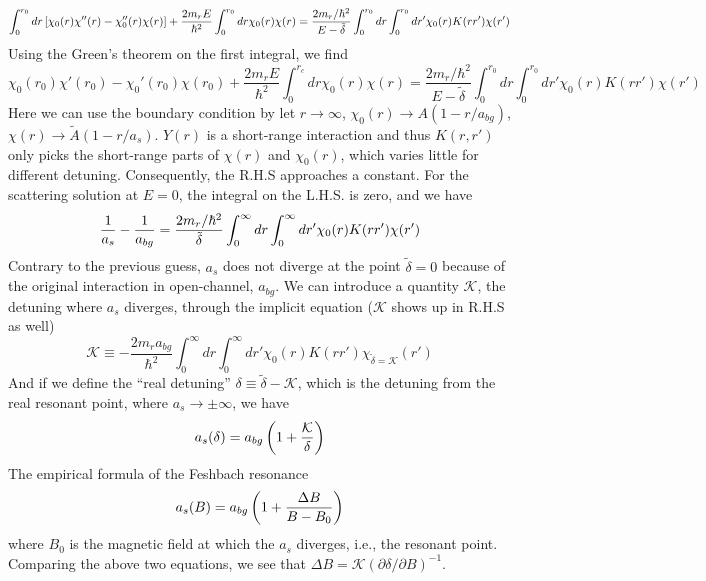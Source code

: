 \begin{equation*}
\int_{0}^{r_{0}}dr\left[\chi_{0}(r)\chi''(r)-\chi_{0}''(r)\chi(r)\right]+\frac{2m_{r}E}{\hbar^{2}}\int_{0}^{r_{0}}dr\chi_{0}(r)\chi(r)
=\frac{2m_{r}/\hbar^{2}}{E-\tilde\delta}\int_{0}^{r_{0}}dr\int_{0}^{r_{0}}dr'\chi_{0}(r)K(rr')\chi(r')
\end{equation*}
Using the Green's theorem on the first integral, we find 
\begin{equation}
\chi_{0}(r_{0})\chi'(r_{0})-\chi_{0}'(r_{0})\chi(r_{0})+\frac{2m_{r}E}{\hbar^{2}}\int_{0}^{r_{c}}dr\chi_{0}(r)\chi(r)
=\frac{2m_{r}/\hbar^{2}}{E-\tilde\delta}\int_{0}^{r_{0}}dr\int_{0}^{r_{0}}dr'\chi_{0}(r)K(rr')\chi(r')
\end{equation}
Here we can use the boundary condition by let $r\rightarrow\infty$, $\chi_{0}(r)\rightarrow{A}(1-r/a_{bg})$, $\chi(r)\rightarrow\tilde{A}(1-r/a_{s})$.  $Y(r)$ is a short-range interaction and thus $K(r,r')$ only picks the short-range parts of $\chi(r)$ and $\chi_{0}(r)$, which varies little for different detuning. Consequently,  the R.H.S approaches a constant.  For the scattering solution at  $E=0$, the integral on the L.H.S. is zero, and we have 
\begin{equation}
\frac{1}{a_{s}}-\frac{1}{a_{bg}}=\frac{2m_{r}/\hbar^{2}}{\tilde\delta}\int_{0}^{\infty}dr\int_{0}^{\infty}dr'\chi_{0}(r)K(rr')\chi(r')
\end{equation}
Contrary to the previous guess, $a_{s}$ does not diverge at the point $\tilde\delta=0$ because of the original interaction in open-channel, $a_{bg}$.  We can introduce a quantity $\mathcal{K}$, the detuning where $a_{s}$ diverges, through the implicit equation ($\mathcal{K}$ shows up in R.H.S as well)
\begin{equation}\label{eq:intro:kappa}
\mathcal{K}\equiv-\frac{2m_{r}a_{bg}}{\hbar^{2}}\int_{0}^{\infty}{dr}\int_{0}^{\infty}dr'\chi_{0}(r)K(rr')\chi_{\tilde\delta=\mathcal{K}}(r')
\end{equation}
And if we define the ``real detuning'' $\delta\equiv\tilde\delta-\mathcal{K}$, which is the detuning from the real resonant point, where $a_{s}\to\pm\infty$, we have 
\begin{equation}\label{eq:intro:asK}
a_{s}(\delta)=a_{bg}\left(1+\frac{\mathcal{K}}{\delta}\right)
\end{equation}
The empirical formula of the Feshbach resonance
\begin{equation}
a_{s}(B)=a_{bg}\left(1+\frac{\Delta{B}}{B-B_{0}}\right)
\end{equation}
where $B_{0}$ is the magnetic field at which the $a_{s}$ diverges, i.e., the  resonant point.  Comparing the above two equations, we see that $\Delta{B}=\mathcal{K}(\partial\delta/\partial{B})^{-1}$.  %
